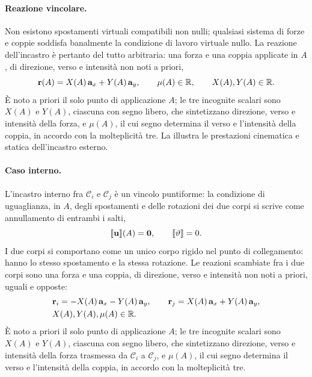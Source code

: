 \paragraph{Reazione vincolare.}
Non esistono spostamenti virtuali compatibili non nulli;
qualsiasi sistema di forze e coppie soddisfa banalmente
la condizione di lavoro virtuale nullo. La reazione
dell'incastro è pertanto del tutto arbitraria: una forza
e una coppia applicate in $A$, di direzione, verso e
intensità non noti a priori,
\begin{equation}\label{eq:reazione_incastro}
	\mathbf{r}(A) = X(A)\,\mathbf{a}_x + Y(A)\,\mathbf{a}_y,
	\qquad
	\mu(A) \in \mathbb{R},
	\qquad
	X(A), Y(A) \in \mathbb{R}.
\end{equation}
È noto a priori il solo punto di applicazione $A$; le tre
incognite scalari sono $X(A)$ e $Y(A)$, ciascuna con segno
libero, che sintetizzano direzione, verso e intensità della
forza, e $\mu(A)$, il cui segno determina il verso e
l'intensità della coppia, in accordo con la molteplicità
tre. La  illustra le prestazioni
cinematica e statica dell'incastro esterno.






\paragraph{Caso interno.}
\label{sec:incastro_interno}
L'incastro interno fra $\mathcal{C}_i$ e $\mathcal{C}_j$ è
un vincolo puntiforme: la condizione di uguaglianza, in $A$,
degli spostamenti e delle rotazioni dei due corpi si scrive
come annullamento di entrambi i salti,
\begin{equation}\label{eq:incastro_int}
	\llbracket \mathbf{u} \rrbracket(A) = \mathbf{0},
	\qquad
	\llbracket \vartheta \rrbracket = 0.
\end{equation}
I due corpi si comportano come un unico corpo rigido nel
punto di collegamento: hanno lo stesso spostamento e la
stessa rotazione. Le reazioni scambiate fra i due corpi
sono una forza e una coppia, di direzione, verso e
intensità non noti a priori, uguali e opposte:
\begin{equation}\label{eq:reazione_incastro_int}
	\begin{aligned}
		&\mathbf{r}_i = -X(A)\,\mathbf{a}_x - Y(A)\,\mathbf{a}_y,
		\qquad
		\mathbf{r}_j = X(A)\,\mathbf{a}_x + Y(A)\,\mathbf{a}_y,
		\\
		&X(A), Y(A), \mu(A) \in \mathbb{R}.
	\end{aligned}
\end{equation}
È noto a priori il solo punto di applicazione $A$; le tre
incognite scalari sono $X(A)$ e $Y(A)$, ciascuna con segno
libero, che sintetizzano direzione, verso e intensità della
forza trasmessa da $\mathcal{C}_i$ a $\mathcal{C}_j$, e
$\mu(A)$, il cui segno determina il verso e l'intensità
della coppia, in accordo con la molteplicità tre.



